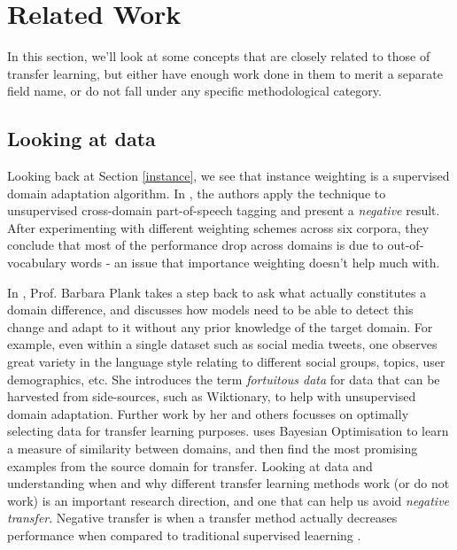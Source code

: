\documentclass[12pt]{report}
\begin{document}
	\section{Related Work}
	In this section, we'll look at some concepts that are closely related to those of transfer learning, but either have enough work done in them to merit a separate field name, or do not fall under any specific methodological category.  
	\subsection{Looking at data}
	 Looking back at Section \ref{instance}, we see that instance weighting is a supervised domain adaptation algorithm. In \citep{plank2014importance}, the authors apply the technique to unsupervised cross-domain part-of-speech tagging and present a \textit{negative} result. After experimenting with different weighting schemes across six corpora, they conclude that most of the performance drop across domains is due to out-of-vocabulary words - an issue that importance weighting doesn't help much with. 
	 \par In \citep{plank2016non}, Prof. Barbara Plank takes a step back to ask what actually constitutes a domain difference, and discusses how models need to be able to detect this change and adapt to it without any prior knowledge of the target domain. For example, even within a single dataset such as social media tweets, one observes great variety in the language style relating to different social groups, topics, user demographics, etc. She introduces the term \textit{fortuitous data} for data that can be harvested from side-sources, such as Wiktionary, to help with unsupervised domain adaptation. Further work by her and others focusses on optimally selecting data for transfer learning purposes. \citep{ruder2017learning} uses Bayesian Optimisation to learn a measure of similarity between domains, and then find the most promising examples from the source domain for transfer. Looking at data and understanding when and why different transfer learning methods work (or do not work) is an important research direction, and one that can help us avoid \textit{negative transfer}. Negative transfer is when a transfer method actually decreases performance when compared to traditional supervised leaerning \citep{torrey2010transfer}.
\end{document}
